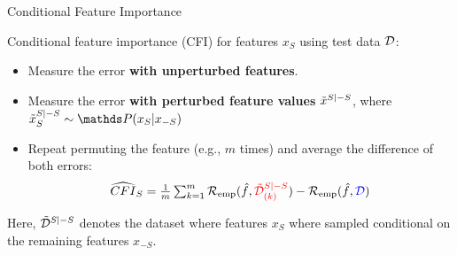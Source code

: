 \documentclass[11pt,compress,t,notes=noshow, aspectratio=169, xcolor=table]{beamer}
\begin{document}



\begin{frame}{Conditional Feature Importance  }
\normalsize

Conditional feature importance (CFI) for features $x_S$ using test data $\D$:
\begin{itemize}
  \item Measure the error \color{blue}\textbf{with unperturbed features}\color{black}.
  \item Measure the error \color{red}\textbf{with perturbed feature values} \color{black} $\pert{x}{S}{-S}$, where $\pert{x}{S}{-S}_S \sim \P(x_S|x_{-S})$
  \item Repeat permuting the feature (e.g., $m$ times) and average the difference of both errors: 
$$\widehat{CFI}_S = \tfrac{1}{m} \textstyle\sum\nolimits_{k = 1}^{m} \riske (\fh, {\color{red}\pert{\D}{S}{-S}_{(k)}}) - \riske (\fh, {\color{blue}\D})$$
\end{itemize}

Here, $\pert{\D}{S}{-S}$ denotes the dataset where features $x_S$ where sampled conditional on the remaining features $x_{-S}$.


\end{frame}
\end{document}
